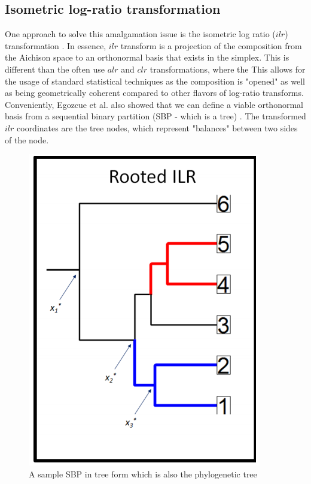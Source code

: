 \documentclass{article}
\begin{document}

\subsection{Isometric log-ratio transformation}
One approach to solve this amalgamation issue is the isometric log ratio ($ilr$) transformation \cite{egozcue2003}. In essence, $ilr$ transform is a projection of the composition from the Aichison space to an orthonormal basis that exists in the simplex. This is different than the often use $alr$ and $clr$ transformations, where the This allows for the usage of standard statistical techniques as the composition is "opened" as well as being geometrically coherent compared to other flavors of log-ratio transforms. Conveniently, Egozcue et al. also showed that we can define a viable orthonormal basis from a sequential binary partition (SBP - which is a tree) \cite{egozcue2003}. The transformed $ilr$ coordinates are the tree nodes, which represent "balances" between two sides of the node. 
\begin{figure}[!htb]
    \centering
    \includegraphics[scale = 0.5]{figures/phylogeny_demonstration.png}
    \caption{A sample SBP in tree form which is also the phylogenetic tree}
    \label{fig:figures/phylogeny_demonstration}
\end{figure}
\end{document}
